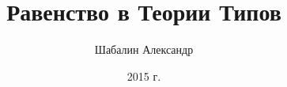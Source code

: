 \documentclass{beamer}
\title{Равенство в Теории Типов}
\author{\scriptsize Шабалин Александр}
\date{\scriptsize 2015 г.}
\begin{document}
\frame{\titlepage}


\end{document}
